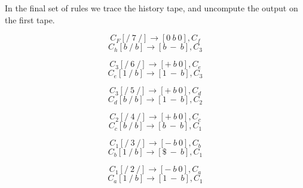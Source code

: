 \documentclass[12pt]{report}
\begin{document}
    In the final set of rules we trace the history tape, and uncompute the output on the first tape.


      \begin{equation}
        C_F [/\ 7\ /] \rightarrow  [0\ b\ 0], C_f \label{eq:rule_C_F}
      \end{equation}
      \begin{equation}
        C_h [b\ /\ b] \rightarrow  [b\ -\ b], C_3  \label{eq:rule_C3prime}
      \end{equation}

      \begin{equation}
        C_3 [/\ 6\ /] \rightarrow  [+\ b\ 0], C_e  \label{eq:rule_C_F}
      \end{equation}
      \begin{equation}
        C_e [1\ /\ b] \rightarrow  [1\ -\ b], C_3  \label{eq:rule_C_F}
      \end{equation}

      \begin{equation}
        C_3 [/\ 5\ /] \rightarrow  [+\ b\ 0], C_d  \label{eq:rule_C_F}
      \end{equation}
      \begin{equation}
        C_d [b\ /\ b] \rightarrow  [1\ -\ b], C_2  \label{eq:rule_C_F}
      \end{equation}

      \begin{equation}
        C_2 [/\ 4\ /] \rightarrow  [+\ b\ 0], C_c  \label{eq:rule_C_F}
      \end{equation}
      \begin{equation}
        C_c [b\ /\ b] \rightarrow  [b\ -\ b], C_1  \label{eq:rule_C_F}
      \end{equation}
      
      \begin{equation}
        C_1 [/\ 3\ /] \rightarrow  [-\ b\ 0], C_b  \label{eq:rule_C_F}
      \end{equation}
      \begin{equation}
        C_b [1\ /\ b] \rightarrow  [\$\ -\ b], C_1  \label{eq:rule_C_F}
      \end{equation}

      \begin{equation}
        C_1 [/\ 2\ /] \rightarrow  [-\ b\ 0], C_a  \label{eq:rule_C_F}
      \end{equation}
      \begin{equation}
        C_a [1\ /\ b] \rightarrow  [1\ -\ b], C_1  \label{eq:rule_C_F1}
      \end{equation}
\end{document}
